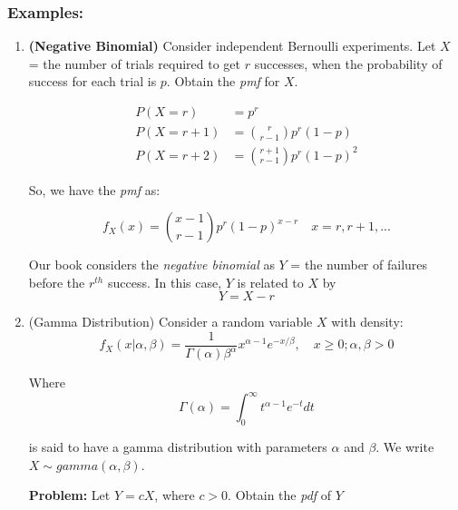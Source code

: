 \documentclass{article}
\begin{document}
\subsubsection*{Examples:}

\begin{enumerate}
    \item \textbf{(Negative Binomial)} Consider independent Bernoulli experiments. Let $X$ = the number of trials required to get $r$ successes, when the probability of success for each trial is $p$. Obtain the \textit{pmf} for $X$.
    
    \begin{equation*}
        \begin{split}
            P(X=r) &= p^r\\
            P(X=r+1) &= {r \choose r-1} p^{r}(1-p)\\
            P(X=r+2) &= {r+1 \choose r-1} p^{r}(1-p)^2
        \end{split}
    \end{equation*}
    
    So, we have the \textit{pmf} as:
    
    \begin{equation*}
        f_X(x) = {x-1 \choose r-1} p^{r} (1-p)^{x-r}\quad x=r,r+1,...
    \end{equation*}

    Our book considers the \textit{negative binomial} as $Y$ = the number of failures before the $r^{th}$ success. In this case, $Y$ is related to $X$ by
    \begin{equation*}
        Y = X-r
    \end{equation*}
    
    \item (Gamma Distribution) Consider a random variable $X$ with density:
    \begin{equation*}
        f_X(x|\alpha,\beta) = \frac{1}{\Gamma(\alpha)\beta^\alpha} x^{\alpha-1} e^{-x/\beta}, \quad x \geq 0; \alpha,\beta > 0
    \end{equation*}
    
    Where
    \begin{equation*}
        \Gamma(\alpha) = \int_0^\infty t^{\alpha-1}e^{-t}dt
    \end{equation*}
    
    is said to have a gamma distribution with parameters $\alpha$ and $\beta$. We write $X \sim gamma(\alpha,\beta)$.
    
    \textbf{Problem:} Let $Y = cX$, where $c > 0$. Obtain the \textit{pdf} of $Y$
    

\end{enumerate}
\end{document}
